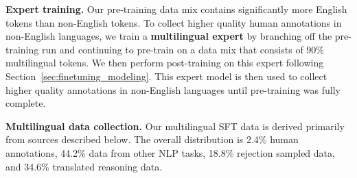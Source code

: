 \textbf{Expert training.} Our \llamathree pre-training data mix contains significantly more English tokens than non-English tokens. To collect higher quality human annotations in non-English languages, we train a \textbf{multilingual expert} by branching off the pre-training run and continuing to pre-train on a data mix that  consists of $90$\% multilingual tokens. We then perform post-training on this expert following Section~\ref{sec:finetuning_modeling}. This expert model is then used to collect higher quality annotations in non-English languages until pre-training was fully complete.

\textbf{Multilingual data collection.} Our multilingual SFT data is derived primarily from sources described below. The overall distribution is 2.4\% human annotations, 44.2\% data from other NLP tasks, 18.8\% rejection sampled data, and 34.6\% translated reasoning data.

